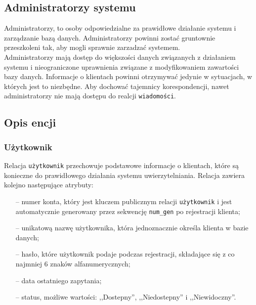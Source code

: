 \documentclass[a4paper,12pt]{article}
\begin{document}
\subsection[Administratorzy systemu]{Administratorzy systemu}
Administratorzy, to osoby odpowiedzialne za prawidłowe działanie systemu i zarządzanie bazą danych.
Administratorzy powinni zostać gruntownie przeszkoleni tak, aby mogli sprawnie
zarzadzać systemem.\\
Administratorzy mają dostęp do większości danych związanych z działaniem systemu i nieograniczone uprawnienia związane
z modyfikowaniem zawartości bazy danych.
Informacje o klientach powinni otrzymywać jedynie w sytuacjach, w których
jest to niezbędne. Aby dochować tajemnicy korespondencji, nawet administratorzy nie mają dostępu do realcji \texttt{wiadomości}.  

\subsection[Opis encji]{Opis encji}
\subsubsection[Użytkownik]{Użytkownik}
Relacja \texttt{użytkownik} przechowuje podstawowe informacje o klientach, które są konieczne do prawidłowego działania systemu uwierzytelniania. Relacja zawiera kolejno następujące atrybuty:
\begin{itemize}
    \item[--] numer konta, który jest kluczem publicznym relacji \texttt{użytkownik} i jest automatycznie generowany przez sekwencję \texttt{num\_gen} po rejestracji klienta;
    \item[--] unikatową nazwę użytkownika, która jednoznacznie określa klienta w bazie danych;
    \item[--] hasło, które użytkownik podaje podczas rejestracji, składające się z co najmniej 6 znaków alfanumerycznych;
    \item[--] data ostatniego zapytania;
    \item[--] status, możliwe wartości: ,,Dostepny'', ,,Niedostepny'' i ,,Niewidoczny''.
\end{itemize}
\end{document}

